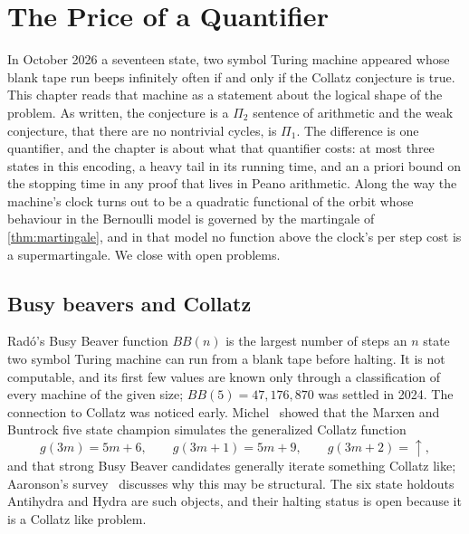 \chapter{The Price of a Quantifier}\label{chap:quantifier}

In October 2026 a seventeen state, two symbol Turing machine appeared whose blank tape run beeps infinitely often if and only if the Collatz conjecture is true. This chapter reads that machine as a statement about the logical shape of the problem. As written, the conjecture is a $\Pi_2$ sentence of arithmetic and the weak conjecture, that there are no nontrivial cycles, is $\Pi_1$. The difference is one quantifier, and the chapter is about what that quantifier costs: at most three states in this encoding, a heavy tail in its running time, and an a priori bound on the stopping time in any proof that lives in Peano arithmetic. Along the way the machine's clock turns out to be a quadratic functional of the orbit whose behaviour in the Bernoulli model is governed by the martingale of \cref{thm:martingale}, and in that model no function above the clock's per step cost is a supermartingale. We close with open problems.

\section{Busy beavers and Collatz}\label{sec:ch21:bb}

Rad\'o's Busy Beaver function $BB(n)$ is the largest number of steps an $n$ state two symbol Turing machine can run from a blank tape before halting. It is not computable, and its first few values are known only through a classification of every machine of the given size; $BB(5)=47{,}176{,}870$ was settled in 2024. The connection to Collatz was noticed early. Michel~\cite{michel1993} showed that the Marxen and Buntrock five state champion simulates the generalized Collatz function
\[
g(3m)=5m+6,\qquad g(3m+1)=5m+9,\qquad g(3m+2)=\uparrow,
\]
and that strong Busy Beaver candidates generally iterate something Collatz like; Aaronson's survey~\cite{aaronson2020} discusses why this may be structural. The six state holdouts Antihydra and Hydra are such objects, and their halting status is open because it is a Collatz like problem.

